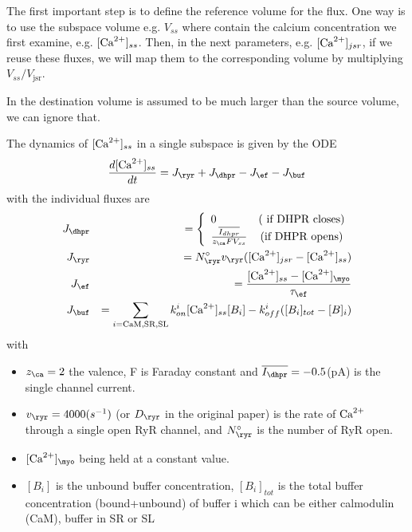 \begin{framed}
  The first important step is to define the reference volume for the
  flux. One way is to use the subspace volume e.g. $V_{ss}$ where
  contain the calcium concentration we first examine,
  e.g. $[{\text{Ca}^{2+}}]_{ss}$. Then, in the next parameters, e.g. $[{\text{Ca}^{2+}}]_{jsr}$,
  if we reuse these fluxes, we will map them to the corresponding
  volume by multiplying $V_{ss}/V_\text{jsr}$.

  In the destination volume is assumed to be much larger than the
  source volume, we can ignore that. 
\end{framed}

The dynamics of $[{\text{Ca}^{2+}}]_{ss}$ in a single subspace is given by the ODE
\begin{eqnarray}
  \label{eq:950}
  \frac{d[\Ca]_{ss}}{dt} = J_\ryr + J_\dhpr - J_\ef - J_\buf
\end{eqnarray}
with the individual fluxes are
\begin{eqnarray}
  \label{eq:951}
  J_\dhpr &&= \left\{
    \begin{array}{lc}
      0 &  (\text{ if DHPR closes})  \\
      \frac{\overline{I_{dhpr}}}{z_\ca F V_{ss}}   & (\text{if DHPR opens})
    \end{array}
  \right. \\
  J_\ryr &&=  N_\ryr^\circ v_\ryr ([\Ca]_{jsr} - [\Ca]_{ss}) \\
  J_\ef &&=  \frac{[\Ca]_{ss}-[\Ca]_\myo}{\tau_\ef} \\
  J_\buf &&= \sum_{i=\text{CaM,SR,SL}} k^i_{on} [\Ca]_{ss}[B_i] -
  k^i_{off}([B_i]_{tot} - [B]_i)
\end{eqnarray}
with
\begin{itemize}
\item $z_\ca=2$ the valence, F is Faraday constant and $\overline{I_\dhpr}
  = -0.5$(pA) is the single channel current.

\item $v_\ryr = 4000 (s^{-1})$ (or $D_\ryr$ in the original paper) is
  the rate of ${\text{Ca}^{2+}}$ through a single open RyR channel, and
  $N_\ryr^\circ$ is the number of RyR open.

\item $[\Ca]_\myo$ being held at a constant value. 

\item $[B_i]$ is the unbound buffer concentration, $[B_i]_{tot}$ is
  the total buffer concentration (bound+unbound) of buffer i which can
  be either calmodulin (CaM), buffer in SR or SL
\end{itemize}

